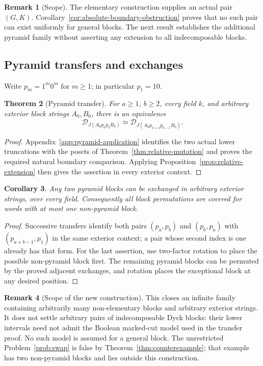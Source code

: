 \documentclass[11pt]{article}
\newtheorem{theorem}{Theorem}[section]
\newtheorem{corollary}[theorem]{Corollary}
\theoremstyle{definition}
\newtheorem{remark}[theorem]{Remark}
\begin{document}
\begin{remark}[Scope]
The elementary construction supplies an actual pair $(G,K)$.
Corollary~\ref{cor:absolute-boundary-obstruction} proves that no such
pair can exist uniformly for general blocks. The next result
establishes the additional pyramid family without asserting any
extension to all indecomposable blocks.
\end{remark}


\subsection{Pyramid transfers and exchanges}
Write $p_m=1^m0^m$ for $m\geq1$; in particular $p_1=10$.

\begin{theorem}[Pyramid transfer]\label{thm:pyramid-transfer}
For $a\geq1$, $b\geq2$, every field $k$, and arbitrary exterior
block strings $A_0,B_0$, there is an equivalence
\[
 \mathcal D_{J(A_0p_a p_b B_0)}\simeq
 \mathcal D_{J(A_0p_{a+1}p_{b-1}B_0)}.
\]
\end{theorem}
\begin{proof}
Appendix~\ref{app:pyramid-application} identifies the two actual lower
truncations with the posets of Theorem~\ref{thm:relative-mutation}
and proves the required natural boundary comparison. Applying
Proposition~\ref{prop:relative-extension} then gives the assertion
in every exterior context.
\end{proof}

\begin{corollary}\label{cor:pyramid-swap}
Any two pyramid blocks can be exchanged in arbitrary exterior
strings, over every field. Consequently all block permutations
are covered for words with at most one non-pyramid block.
\end{corollary}
\begin{proof}
Successive transfers identify both pairs $(p_a,p_b)$ and
$(p_b,p_a)$ with $(p_{a+b-1},p_1)$ in the same exterior context;
a pair whose second index is one already has that form.
For the last assertion, use two-factor rotation to place the
possible non-pyramid block first. The remaining pyramid blocks
can be permuted by the proved adjacent exchanges, and rotation
places the exceptional block at any desired position.
\end{proof}

\begin{remark}[Scope of the new construction]
This closes an infinite family containing arbitrarily many
non-elementary blocks and arbitrary exterior strings. It does
not settle arbitrary pairs of indecomposable Dyck blocks: their
lower intervals need not admit the Boolean marked-cut model used
in the transfer proof. No such model is assumed for a general
block. The unrestricted Problem~\ref{prob:swap} is false by
Theorem~\ref{thm:counterexample}; that example has two non-pyramid
blocks and lies outside this construction.
\end{remark}
\end{document}

